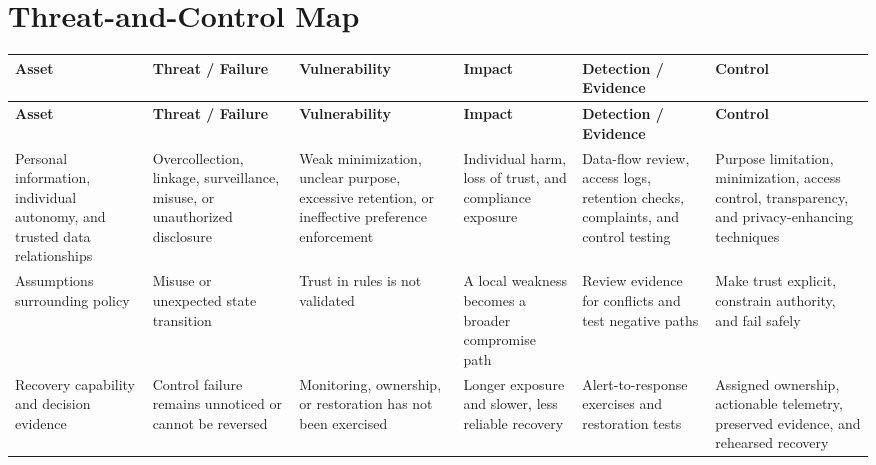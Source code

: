 \documentclass[11pt,letterpaper]{article}
\begin{document}
\section*{Threat-and-Control Map}
\begingroup\scriptsize\setlength{\tabcolsep}{2pt}
\begin{longtable}{>{\raggedright\arraybackslash}p{}>{\raggedright\arraybackslash}p{}>{\raggedright\arraybackslash}p{}>{\raggedright\arraybackslash}p{}>{\raggedright\arraybackslash}p{}>{\raggedright\arraybackslash}p{}}
\toprule\rowcolor{Navy}\color{white}\textbf{Asset} & \color{white}\textbf{Threat / Failure} & \color{white}\textbf{Vulnerability} & \color{white}\textbf{Impact} & \color{white}\textbf{Detection / Evidence} & \color{white}\textbf{Control}\\\midrule
\endfirsthead
\toprule\rowcolor{Navy}\color{white}\textbf{Asset} & \color{white}\textbf{Threat / Failure} & \color{white}\textbf{Vulnerability} & \color{white}\textbf{Impact} & \color{white}\textbf{Detection / Evidence} & \color{white}\textbf{Control}\\\midrule
\endhead
Personal information, individual autonomy, and trusted data relationships & Overcollection, linkage, surveillance, misuse, or unauthorized disclosure & Weak minimization, unclear purpose, excessive retention, or ineffective preference enforcement & Individual harm, loss of trust, and compliance exposure & Data-flow review, access logs, retention checks, complaints, and control testing & Purpose limitation, minimization, access control, transparency, and privacy-enhancing techniques\\\midrule
Assumptions surrounding policy & Misuse or unexpected state transition & Trust in rules is not validated & A local weakness becomes a broader compromise path & Review evidence for conflicts and test negative paths & Make trust explicit, constrain authority, and fail safely\\\midrule
Recovery capability and decision evidence & Control failure remains unnoticed or cannot be reversed & Monitoring, ownership, or restoration has not been exercised & Longer exposure and slower, less reliable recovery & Alert-to-response exercises and restoration tests & Assigned ownership, actionable telemetry, preserved evidence, and rehearsed recovery\\\midrule
\bottomrule
\end{longtable}
\endgroup
\end{document}
